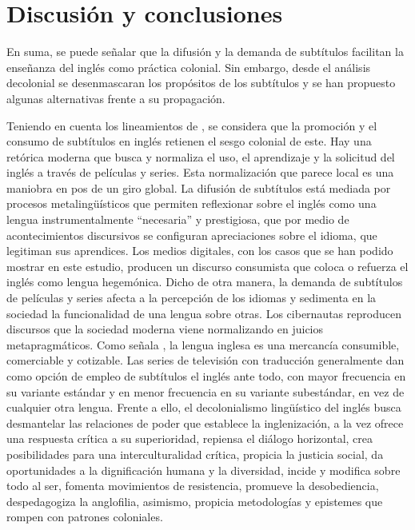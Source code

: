 \documentclass[spanish]{textolivre}
\begin{document}
\section{Discusión y conclusiones}
En suma, se puede señalar que la difusión y la demanda de subtítulos facilitan la enseñanza del inglés como práctica colonial. Sin embargo, desde el análisis decolonial se desenmascaran los propósitos de los subtítulos y se han propuesto algunas alternativas frente a su propagación.

Teniendo en cuenta los lineamientos de \textcite{baum2019decir}, se considera que la promoción y el consumo de subtítulos en inglés retienen el sesgo colonial de este. Hay una retórica moderna que busca y normaliza el uso, el aprendizaje y la solicitud del inglés a través de películas y series. Esta normalización que parece local es una maniobra en pos de un giro global. La difusión de subtítulos está mediada por procesos metalingüísticos que permiten reflexionar sobre el inglés como una lengua instrumentalmente “necesaria” y prestigiosa, que por medio de acontecimientos discursivos se configuran apreciaciones sobre el idioma, que legitiman sus aprendices. Los medios digitales, con los casos que se han podido mostrar en este estudio, producen un discurso consumista que coloca o refuerza el inglés como lengua hegemónica. Dicho de otra manera, la demanda de subtítulos de películas y series afecta a la percepción de los idiomas y sedimenta en la sociedad la funcionalidad de una lengua sobre otras. Los cibernautas reproducen discursos que la sociedad moderna viene normalizando en juicios metapragmáticos. Como señala \textcite{baum2016problematicas}, la lengua inglesa es una mercancía consumible, comerciable y cotizable. Las series de televisión con traducción generalmente dan como opción de empleo de subtítulos el inglés ante todo, con mayor frecuencia en su variante estándar y en menor frecuencia en su variante subestándar, en vez de cualquier otra lengua. Frente a ello, el decolonialismo lingüístico del inglés busca desmantelar las relaciones de poder que establece la inglenización, a la vez ofrece una respuesta crítica a su superioridad, repiensa el diálogo horizontal, crea posibilidades para una interculturalidad crítica, propicia la justicia social, da oportunidades a la dignificación humana y la diversidad, incide y modifica sobre todo al ser, fomenta movimientos de resistencia, promueve la desobediencia, despedagogiza la anglofilia, asimismo, propicia metodologías y epistemes que rompen con patrones coloniales.  
\end{document}
